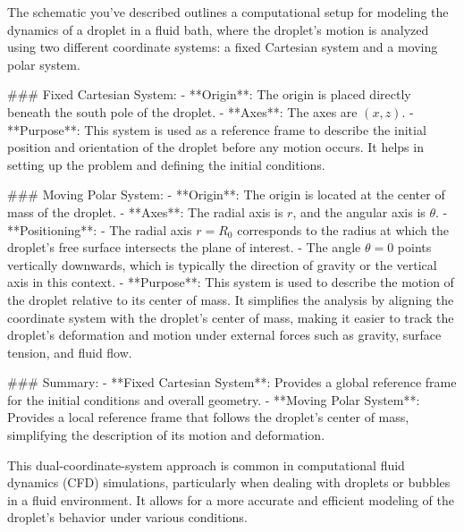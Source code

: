 The schematic you've described outlines a computational setup for modeling the dynamics of a droplet in a fluid bath, where the droplet's motion is analyzed using two different coordinate systems: a fixed Cartesian system and a moving polar system.

### Fixed Cartesian System:
- **Origin**: The origin is placed directly beneath the south pole of the droplet.
- **Axes**: The axes are \( (x, z) \).
- **Purpose**: This system is used as a reference frame to describe the initial position and orientation of the droplet before any motion occurs. It helps in setting up the problem and defining the initial conditions.

### Moving Polar System:
- **Origin**: The origin is located at the center of mass of the droplet.
- **Axes**: The radial axis is \( r \), and the angular axis is \( \theta \).
- **Positioning**:
  - The radial axis \( r = R_0 \) corresponds to the radius at which the droplet's free surface intersects the plane of interest.
  - The angle \( \theta = 0 \) points vertically downwards, which is typically the direction of gravity or the vertical axis in this context.
- **Purpose**: This system is used to describe the motion of the droplet relative to its center of mass. It simplifies the analysis by aligning the coordinate system with the droplet's center of mass, making it easier to track the droplet's deformation and motion under external forces such as gravity, surface tension, and fluid flow.

### Summary:
- **Fixed Cartesian System**: Provides a global reference frame for the initial conditions and overall geometry.
- **Moving Polar System**: Provides a local reference frame that follows the droplet's center of mass, simplifying the description of its motion and deformation.

This dual-coordinate-system approach is common in computational fluid dynamics (CFD) simulations, particularly when dealing with droplets or bubbles in a fluid environment. It allows for a more accurate and efficient modeling of the droplet's behavior under various conditions.